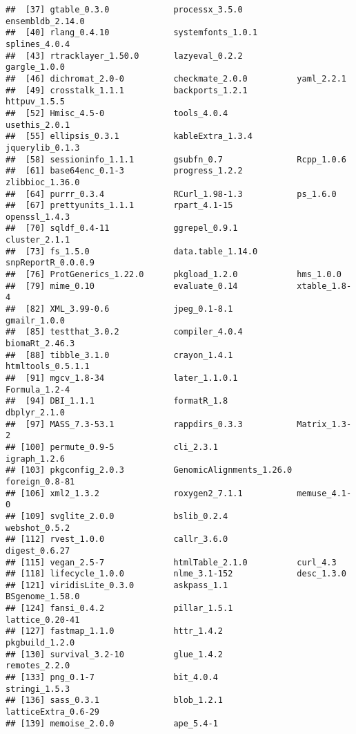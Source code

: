 \documentclass[
]{article}
\begin{document}
\begin{verbatim}
##  [37] gtable_0.3.0             processx_3.5.0           ensembldb_2.14.0        
##  [40] rlang_0.4.10             systemfonts_1.0.1        splines_4.0.4           
##  [43] rtracklayer_1.50.0       lazyeval_0.2.2           gargle_1.0.0            
##  [46] dichromat_2.0-0          checkmate_2.0.0          yaml_2.2.1              
##  [49] crosstalk_1.1.1          backports_1.2.1          httpuv_1.5.5            
##  [52] Hmisc_4.5-0              tools_4.0.4              usethis_2.0.1           
##  [55] ellipsis_0.3.1           kableExtra_1.3.4         jquerylib_0.1.3         
##  [58] sessioninfo_1.1.1        gsubfn_0.7               Rcpp_1.0.6              
##  [61] base64enc_0.1-3          progress_1.2.2           zlibbioc_1.36.0         
##  [64] purrr_0.3.4              RCurl_1.98-1.3           ps_1.6.0                
##  [67] prettyunits_1.1.1        rpart_4.1-15             openssl_1.4.3           
##  [70] sqldf_0.4-11             ggrepel_0.9.1            cluster_2.1.1           
##  [73] fs_1.5.0                 data.table_1.14.0        snpReportR_0.0.0.9      
##  [76] ProtGenerics_1.22.0      pkgload_1.2.0            hms_1.0.0               
##  [79] mime_0.10                evaluate_0.14            xtable_1.8-4            
##  [82] XML_3.99-0.6             jpeg_0.1-8.1             gmailr_1.0.0            
##  [85] testthat_3.0.2           compiler_4.0.4           biomaRt_2.46.3          
##  [88] tibble_3.1.0             crayon_1.4.1             htmltools_0.5.1.1       
##  [91] mgcv_1.8-34              later_1.1.0.1            Formula_1.2-4           
##  [94] DBI_1.1.1                formatR_1.8              dbplyr_2.1.0            
##  [97] MASS_7.3-53.1            rappdirs_0.3.3           Matrix_1.3-2            
## [100] permute_0.9-5            cli_2.3.1                igraph_1.2.6            
## [103] pkgconfig_2.0.3          GenomicAlignments_1.26.0 foreign_0.8-81          
## [106] xml2_1.3.2               roxygen2_7.1.1           memuse_4.1-0            
## [109] svglite_2.0.0            bslib_0.2.4              webshot_0.5.2           
## [112] rvest_1.0.0              callr_3.6.0              digest_0.6.27           
## [115] vegan_2.5-7              htmlTable_2.1.0          curl_4.3                
## [118] lifecycle_1.0.0          nlme_3.1-152             desc_1.3.0              
## [121] viridisLite_0.3.0        askpass_1.1              BSgenome_1.58.0         
## [124] fansi_0.4.2              pillar_1.5.1             lattice_0.20-41         
## [127] fastmap_1.1.0            httr_1.4.2               pkgbuild_1.2.0          
## [130] survival_3.2-10          glue_1.4.2               remotes_2.2.0           
## [133] png_0.1-7                bit_4.0.4                stringi_1.5.3           
## [136] sass_0.3.1               blob_1.2.1               latticeExtra_0.6-29     
## [139] memoise_2.0.0            ape_5.4-1
\end{verbatim}
\end{document}
